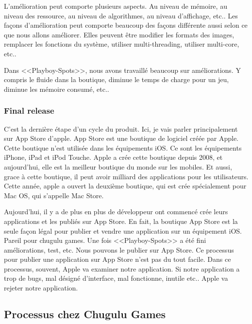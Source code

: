 L'amélioration peut comporte plusieurs aspects. Au niveau de mémoire, au niveau des ressource, au niveau de algorithmes, au niveau d'affichage, etc.. Les façons d'amélioration peut comporte beaucoup des façons différente aussi selon ce que nous allons améliorer. Elles peuvent être modifier les formats des images, remplacer les fonctions du système, utiliser multi-threading, utiliser multi-core, etc..

Dans <<Playboy-Spots>>, nous avons travaillé beaucoup sur améliorations. Y compris le fluide dans la boutique, diminue le temps de charge pour un jeu, diminue les mémoire consumé, etc.. 


\subsubsection{Final release} %
\label{ssub:final_release}

C'est la dernière étape d'un cycle du produit. Ici, je vais parler principalement sur App Store d'apple. App Store est une boutique de logiciel créée par Apple. Cette boutique n'est utilisée dans les équipements iOS. Ce sont les équipements iPhone, iPad et iPod Touche. Apple a crée cette boutique depuis 2008, et aujourd'hui, elle est la meilleur boutique du monde sur les mobiles. Et aussi, grace à cette boutique, il peut avoir milliard des applications pour les utilisateurs. Cette année, apple a ouvert la deuxième boutique, qui est crée spécialement pour Mac OS, qui s'appelle Mac Store. 

Aujourd'hui, il y a de plus en plus de développeur ont commencé crée leurs applications et les publiés sur App Store. En fait, la boutique App Store est la seule façon légal pour publier et vendre une application sur un équipement iOS. Pareil pour chugulu games. Une fois <<Playboy-Spots>> a été fini améliorations, test, etc. Nous pouvons le publier sur App Store. Ce processus pour publier une application sur App Store n'est pas du tout facile. Dans ce processus, souvent, Apple va examiner notre application. Si notre application a trop de bugs, mal désigné d'interface, mal fonctionne, inutile etc.. Apple va rejeter notre application.



\subsection{Processus chez Chugulu Games} %
\label{sub:processus_chez_chugulu_games}

